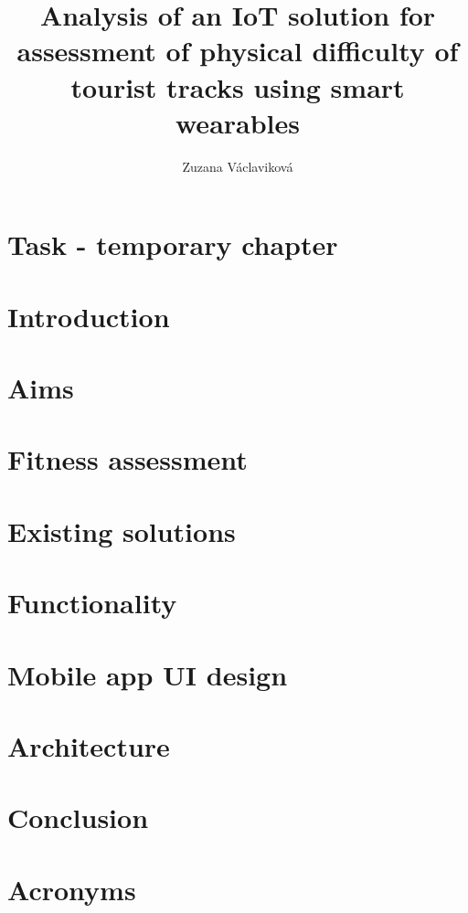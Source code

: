 \documentclass[thesis=B,english]{FITthesis}[2019/03/21]
\title{Analysis of an IoT solution for assessment of physical difficulty of tourist tracks using smart wearables}
\author{Zuzana Václaviková} %
\begin{document}


\chapter{Task - temporary chapter}


\chapter{Introduction}


\chapter{Aims}

\chapter{Fitness assessment}

\chapter{Existing solutions}

\chapter{Functionality}

\chapter{Mobile app UI design}

\chapter{Architecture}


\chapter{Conclusion}





\appendix

\chapter{Acronyms}

\end{document}
